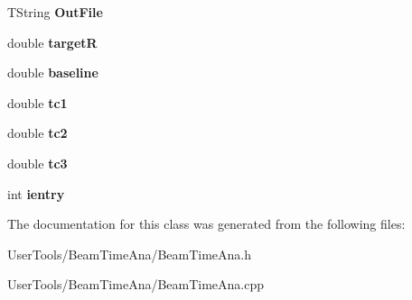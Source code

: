 \begin{DoxyCompactItemize}
\item 
\hypertarget{classBeamTimeAna_a4d2aeab4e93fc15010e6fd1bf56edcdb}{
TString {\bfseries OutFile}}
\label{classBeamTimeAna_a4d2aeab4e93fc15010e6fd1bf56edcdb}

\item 
\hypertarget{classBeamTimeAna_aaf94fd2c4bae8719cb3e40a467d427cd}{
double {\bfseries targetR}}
\label{classBeamTimeAna_aaf94fd2c4bae8719cb3e40a467d427cd}

\item 
\hypertarget{classBeamTimeAna_a0df7b44ed1be5e0f23c6384dc09b01ca}{
double {\bfseries baseline}}
\label{classBeamTimeAna_a0df7b44ed1be5e0f23c6384dc09b01ca}

\item 
\hypertarget{classBeamTimeAna_ac21d70b3320574398e3251092f2c7ef5}{
double {\bfseries tc1}}
\label{classBeamTimeAna_ac21d70b3320574398e3251092f2c7ef5}

\item 
\hypertarget{classBeamTimeAna_ac3ff88abf8e308b8fad48bf1a994f530}{
double {\bfseries tc2}}
\label{classBeamTimeAna_ac3ff88abf8e308b8fad48bf1a994f530}

\item 
\hypertarget{classBeamTimeAna_a64a9f3610a0412a83b6f090e1622ef79}{
double {\bfseries tc3}}
\label{classBeamTimeAna_a64a9f3610a0412a83b6f090e1622ef79}

\item 
\hypertarget{classBeamTimeAna_a9fc48b9d0c43a1d696139811d15ba3c7}{
int {\bfseries ientry}}
\label{classBeamTimeAna_a9fc48b9d0c43a1d696139811d15ba3c7}

\end{DoxyCompactItemize}


The documentation for this class was generated from the following files:\begin{DoxyCompactItemize}
\item 
UserTools/BeamTimeAna/BeamTimeAna.h\item 
UserTools/BeamTimeAna/BeamTimeAna.cpp\end{DoxyCompactItemize}
